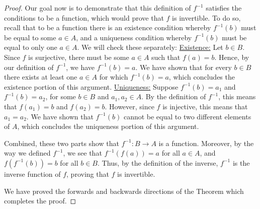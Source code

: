 \documentclass{amsart}
\theoremstyle{definition}
\theoremstyle{definition}
\theoremstyle{remark}
\begin{document}
\begin{proof}
      Our goal now is to demonstrate that this definition of $f^{-1}$ satisfies the conditions to be a function, which would prove that $f$ is invertible. To do so, recall that to be a function there is an existence condition whereby $f^{-1}(b)$ must be equal to some $a\in A$, and a uniqueness condition whereby $f^{-1}(b)$ must be equal to only one $a\in A$. We will check these separately:
      \medskip
      \underline{Existence:} Let $b\in B$. Since $f$ is surjective, there must be some $a\in A$ such that $f(a)=b$. Hence, by our definition of $f^{-1}$, we have $f^{-1}(b)=a$. We have shown that for every $b\in B$ there exists at least one $a\in A$ for which $f^{-1}(b)=a$, which concludes the existence portion of this argument.
      \smallskip
      \underline{Uniqueness:} Suppose $f^{-1}(b)=a_1$ and $f^{-1}(b)=a_2$, for some $b\in B$ and $a_1,a_2\in A$. By the definition of $f^{-1}$, this means that $f(a_1)=b$ and $f(a_2)=b$. However, since $f$ is injective, this means that $a_1=a_2$. We have shown that $f^{-1}(b)$ cannot be equal to two different elements of $A$, which concludes the uniqueness portion of this argument.


      Combined, these two parts show that $f^{-1}:B\rightarrow A$ is a function. Moreover, by the way we defined $f^{-1}$, we see that $f^{-1}(f(a))=a$ for all $a\in A$, and $f(f^{-1}(b))=b$ for all $b\in B$. Thus, by the definition of the inverse, $f^{-1}$ is the inverse function of $f$, proving that $f$ is invertible.


      We have proved the forwards and backwards directions of the Theorem which completes the proof.
\end{proof}
\end{document}

